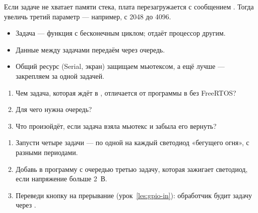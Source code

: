 \begin{caution}
Если задаче не хватает памяти стека, плата перезагружается с сообщением .
Тогда увеличь третий параметр  --- например, с 2048 до 4096.
\end{caution}

\begin{summary}
\begin{itemize}[leftmargin=*]
  \item Задача --- функция с бесконечным циклом;  отдаёт процессор другим.
  \item Данные между задачами передаём через очередь.
  \item Общий ресурс (Serial, экран) защищаем мьютексом, а ещё лучше --- закрепляем за одной задачей.
\end{itemize}
\end{summary}

\begin{quiz}
\begin{enumerate}
  \item Чем задача, которая ждёт в , отличается от программы в  без FreeRTOS?
  \item Для чего нужна очередь?
  \item Что произойдёт, если задача взяла мьютекс и забыла его вернуть?
\end{enumerate}
\end{quiz}

\begin{tasks}
\begin{enumerate}
  \item Запусти четыре задачи --- по одной на каждый светодиод «бегущего огня», с разными периодами.
  \item Добавь в программу с очередью третью задачу, которая зажигает светодиод, если напряжение больше 2~В.
  \item Переведи кнопку на прерывание (урок~\ref{les:gpio-in}): обработчик будит задачу через .
\end{enumerate}
\end{tasks}
